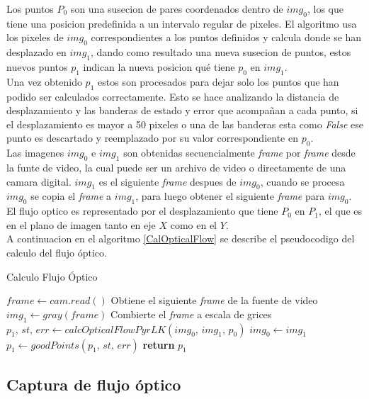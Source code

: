 \documentclass{iccmemoria}
\begin{document}
Los puntos $P_0$ son una susecion de pares coordenados dentro de $img_0$, los que tiene una posicion predefinida a un intervalo regular de pixeles. El algoritmo usa los pixeles de $img_0$ correspondientes a los puntos definidos y calcula donde se han desplazado en $img_1$, dando como resultado una nueva susecion de puntos, estos nuevos puntos $p_1$ indican la nueva posicion qué tiene $p_0$ en $img_1$.\\

Una vez obtenido $p_1$ estos son procesados para dejar solo los puntos que han podido ser calculados correctamente. Esto se hace analizando la distancia de desplazamiento y las banderas de estado y error que acompañan a cada punto, si el desplazamiento es mayor a 50 pixeles o una de las banderas esta como \emph{False} ese punto es descartado y reemplazado por su valor correspondiente en $p_0$.\\

Las imagenes $img_0$ e $img_1$ son obtenidas secuencialmente \emph{frame} por \emph{frame} desde la funte de video, la cual puede ser un archivo de video o directamente de una camara digital. $img_1$ es el siguiente \emph{frame} despues de $img_0$, cuando se procesa $img_0$ se copia el \emph{frame} a $img_1$, para luego obtener el siguiente \emph{frame} para $img_0$.\\

El flujo optico es representado por el desplazamiento que tiene $P_0$ en $P_1$, el que es en el plano de imagen tanto en eje $X$ como en el $Y$.\\

A continuacion en el algoritmo \ref{CalOpticalFlow} se describe el pseudocodigo del calculo del flujo óptico.

\begin{algorithm}
\caption{Calculo Flujo Óptico}\label{CalOpticalFlow}
\begin{algorithmic}[1]
\State $frame \gets cam.read()$ \Comment Obtiene el siguiente \emph{frame} de la fuente de video
\State $img_1 \gets gray(frame)$ \Comment Combierte el \emph{frame} a escala de grices
\State $p_1,\, st,\, err \gets calcOpticalFlowPyrLK(img_0,\, img_1,\, p_0) $
\State $img_0 \gets img_1$
\State $p_1 \gets goodPoints(p_1,\, st,\, err)$ \Comment 
\State \textbf{return} $p_1$

\EndFunction
\end{algorithmic}
\end{algorithm}

\subsection{Captura de flujo óptico}
\end{document}
